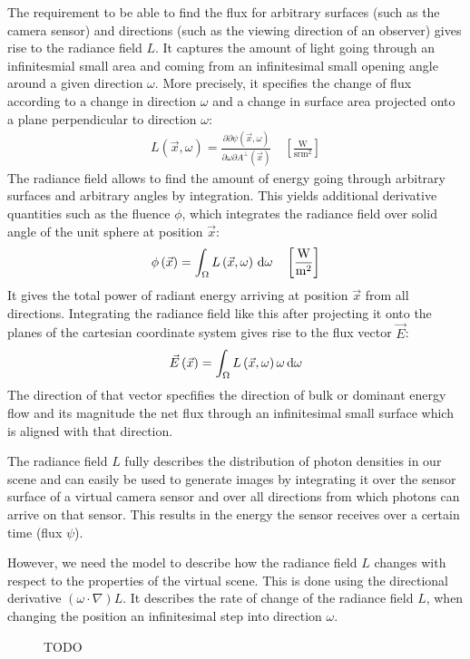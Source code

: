 The requirement to be able to find the flux for arbitrary surfaces (such as the camera sensor) and directions (such as the viewing direction of an observer) gives rise to the radiance field $L$. It captures the amount of light going through an infinitesmial small area and coming from an infinitesimal small opening angle around a given direction $\omega$. More precisely, it specifies the change of flux according to a change in direction $\omega$ and a change in surface area projected onto a plane perpendicular to direction $\omega$:
\begin{align*}
L\left(\vec{x}, \omega\right) = \frac{\partial\partial\psi\left(\vec{x}, \omega\right)}{\partial\omega\partial A^\perp\left(\vec{x}\right)}
\quad
\left[\frac{\si{\watt}}{\si{\steradian} \si{\meter}^2}\right]
\end{align*}
The radiance field allows to find the amount of energy going through arbitrary surfaces and arbitrary angles by integration. This yields additional derivative quantities such as the fluence $\phi$, which integrates the radiance field over solid angle of the unit sphere at position $\vec{x}$:
\begin{align*}
\phi\left(\vec{x}\right) = \int_\Omega L\left(\vec{x}, \omega\right) \,\mathrm{d}\omega
\quad
\left[\frac{\si{\watt}}{\si{\meter}^2}\right]
\end{align*}
It gives the total power of radiant energy arriving at position $\vec{x}$ from all directions. Integrating the radiance field like this after projecting it onto the planes of the cartesian coordinate system gives rise to the flux vector $\vec{E}$:
\begin{align*}
\vec{E}\left(\vec{x}\right) = \int_\Omega L\left(\vec{x}, \omega\right)\omega \,\mathrm{d}\omega
\end{align*}
The direction of that vector specfifies the direction of bulk or dominant energy flow and its magnitude the net flux through an infinitesimal small surface which is aligned with that direction.

The radiance field $L$ fully describes the distribution of photon densities in our scene and can easily be used to generate images by integrating it over the sensor surface of a virtual camera sensor and over all directions from which photons can arrive on that sensor. This results in the energy the sensor receives over a certain time (flux $\psi$).


However, we need the model to describe how the radiance field $L$ changes with respect to the properties of the virtual scene. This is done using the directional derivative $\left(\omega\cdot\nabla\right)L$. It describes the rate of change of the radiance field $L$, when changing the position an infinitesimal step into direction $\omega$.
\begin{figure}[h]
\centering
{}
\caption{TODO}
\label{fig:rte_change_of_L}
\end{figure}

